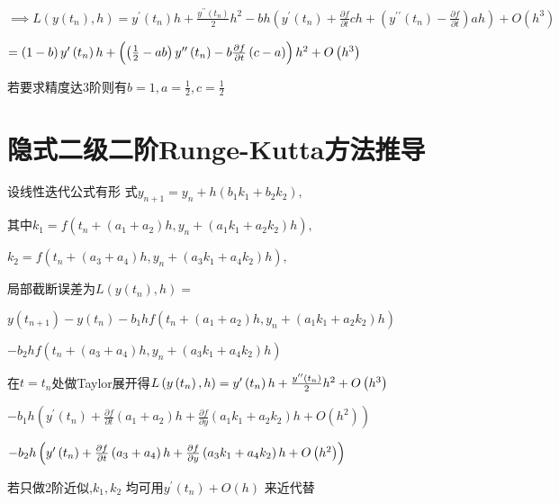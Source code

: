 \documentclass{ctexart}
\begin{document}
$\implies L\left( y\left( t_{n}\right) ,h\right) =y^{\prime }\left(
t_{n}\right) h+\frac{y^{\prime \prime }\left( t_{n}\right) }{2}%
h^{2}-bh\left( y^{\prime }\left( t_{n}\right) +\frac{\partial f}{\partial t}%
ch+\left( y^{\prime \prime }\left( t_{n}\right) -\frac{\partial f}{\partial t%
}\right) ah\right) +O\left( h^{3}\right) $

$=\left( 1-b\right) y^{\prime }\left( t_{n}\right) h+\left( \left( \frac{1}{2%
}-ab\right) y^{\prime \prime }\left( t_{n}\right) -b\frac{\partial f}{%
\partial t}\left( c-a\right) \right) h^{2}+O\left( h^{3}\right) $

若要求精度达3阶则有$%
b=1,a=\frac{1}{2},c=\frac{1}{2}$

\bigskip 

\section{隐式二级二阶Runge-Kutta方法推导}

设线性迭代公式有形%
式$y_{n+1}=y_{n}+h\left( b_{1}k_{1}+b_{2}k_{2}\right) ,$

其中$k_{1}=f\left( t_{n}+\left( a_{1}+a_{2}\right)
h,y_{n}+\left( a_{1}k_{1}+a_{2}k_{2}\right) h\right) ,$

$k_{2}=f\left( t_{n}+\left( a_{3}+a_{4}\right) h,y_{n}+\left(
a_{3}k_{1}+a_{4}k_{2}\right) h\right) ,$

局部截断误差为$L\left( y\left(
t_{n}\right) ,h\right) =$

$y\left( t_{n+1}\right) -y\left( t_{n}\right) -b_{1}hf\left( t_{n}+\left(
a_{1}+a_{2}\right) h,y_{n}+\left( a_{1}k_{1}+a_{2}k_{2}\right) h\right) $

$-b_{2}hf\left( t_{n}+\left( a_{3}+a_{4}\right) h,y_{n}+\left(
a_{3}k_{1}+a_{4}k_{2}\right) h\right) $

在$t=t_{n}$处做Taylor展开得$L\left(
y\left( t_{n}\right) ,h\right) =y^{\prime }\left( t_{n}\right) h+\frac{%
y^{\prime \prime }\left( t_{n}\right) }{2}h^{2}+O\left( h^{3}\right) $

$-b_{1}h\left( y^{\prime }\left( t_{n}\right) +\frac{\partial f}{\partial t}%
\left( a_{1}+a_{2}\right) h+\frac{\partial f}{\partial y}\left(
a_{1}k_{1}+a_{2}k_{2}\right) h+O\left( h^{2}\right) \right) $

\bigskip $-b_{2}h\left( y^{\prime }\left( t_{n}\right) +\frac{\partial f}{%
\partial t}\left( a_{3}+a_{4}\right) h+\frac{\partial f}{\partial y}\left(
a_{3}k_{1}+a_{4}k_{2}\right) h+O\left( h^{2}\right) \right) $

\bigskip 若只做2阶近似,$k_{1},k_{2}$%
均可用$y^{\prime }\left( t_{n}\right) +O\left( h\right) $%
来近代替
\end{document}
